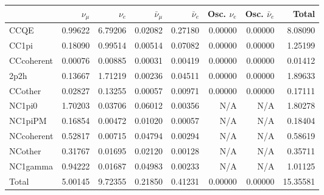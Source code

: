 \begin{tabular} { | l ||r | r | r | r | r | r | | r | }
\hline
              & $\nu_\mu$            & $\nu_e$              & $\bar{\nu}_{\mu}$    & $\bar{\nu}_{e}$      & Osc. $\nu_e$         & Osc. $\bar{\nu}_{e}$ & Total                \\ \hline\hline
 CCQE         & 0.99622              & 6.79206              & 0.02082              & 0.27180              & 0.00000              & 0.00000              & 8.08090              \\ \hline
 CC1pi        & 0.18090              & 0.99514              & 0.00514              & 0.07082              & 0.00000              & 0.00000              & 1.25199              \\ \hline
 CCcoherent   & 0.00076              & 0.00885              & 0.00031              & 0.00419              & 0.00000              & 0.00000              & 0.01412              \\ \hline
 2p2h         & 0.13667              & 1.71219              & 0.00236              & 0.04511              & 0.00000              & 0.00000              & 1.89633              \\ \hline
 CCother      & 0.02827              & 0.13255              & 0.00057              & 0.00971              & 0.00000              & 0.00000              & 0.17111              \\ \hline
 NC1pi0       & 1.70203              & 0.03706              & 0.06012              & 0.00356              & N/A                  & N/A                  & 1.80278              \\ \hline
 NC1piPM      & 0.16854              & 0.00472              & 0.01020              & 0.00057              & N/A                  & N/A                  & 0.18404              \\ \hline
 NCcoherent   & 0.52817              & 0.00715              & 0.04794              & 0.00294              & N/A                  & N/A                  & 0.58619              \\ \hline
 NCother      & 0.31767              & 0.01695              & 0.02120              & 0.00128              & N/A                  & N/A                  & 0.35711              \\ \hline
 NC1gamma     & 0.94222              & 0.01687              & 0.04983              & 0.00233              & N/A                  & N/A                  & 1.01125              \\ \hline
\hline
 Total        & 5.00145              & 9.72355              & 0.21850              & 0.41231              & 0.00000              & 0.00000              & 15.35581             \\ \hline

\end{tabular}
